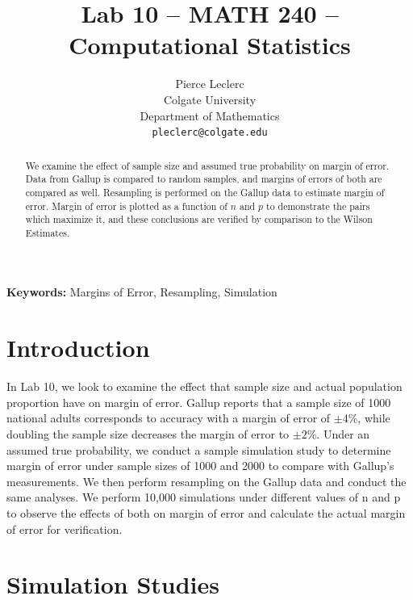 \documentclass{article}\usepackage[]{graphicx}\usepackage[]{xcolor}
\begin{document}
\vspace{-1in}
\title{Lab 10 -- MATH 240 -- Computational Statistics}

\author{
  Pierce Leclerc \\
  Colgate University  \\
  Department of Mathematics  \\
  {\tt pleclerc@colgate.edu}
}

\date{}

\maketitle

\begin{multicols}{2}
\begin{abstract}
We examine the effect of sample size and assumed true probability on margin of error. Data from Gallup is compared to random samples, and margins of errors of both are compared as well. Resampling is performed on the Gallup data to estimate margin of error. Margin of error is plotted as a function of $n$ and $p$ to demonstrate the pairs which maximize it, and these conclusions are verified by comparison to the Wilson Estimates.
\end{abstract}

\noindent \textbf{Keywords:} Margins of Error, Resampling, Simulation

\section{Introduction}
In Lab 10, we look to examine the effect that sample size and actual population proportion have on margin of error. Gallup reports that a sample size of 1000 national adults corresponds to accuracy with a margin of error of $\pm 4\%$, while doubling the sample size decreases the margin of error to $\pm 2\%$. Under an assumed true probability, we conduct a sample simulation study to determine margin of error under sample sizes of 1000 and 2000 to compare with Gallup's measurements. We then perform resampling on the Gallup data and conduct the same analyses. We perform 10,000 simulations under different values of n and p to observe the effects of both on margin of error and calculate the actual margin of error for verification.

\section{Simulation Studies}


\end{multicols}
\end{document}

